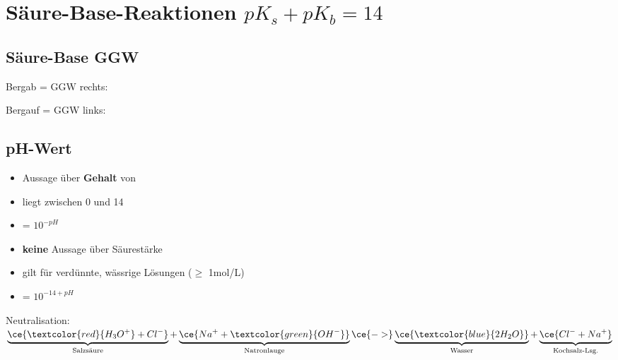 \section{Säure-Base-Reaktionen $pK_{s}+ pK_{b} = 14$}
    
\subsection{Säure-Base GGW}
    Bergab = GGW rechts: 

    Bergauf = GGW links: 

\subsection{pH-Wert}
    \begin{minipage}{0.4\columnwidth}
        \begin{itemize}
            \item Aussage über \textbf{Gehalt} von 
            \item liegt zwischen 0 und 14
            \item \ce{[H3O+]} = $10^{-pH}$
        \end{itemize}
    \end{minipage}
    \hfill
    \begin{minipage}{0.59\columnwidth}
        \begin{itemize}
            \item \textbf{keine} Aussage über Säurestärke
            \item gilt für verdünnte, wässrige Lösungen ($\geq$ 1mol/L)
            \item \ce{[OH^-]} = $10^{-14+pH}$
        \end{itemize}
    \end{minipage}
    
    Neutralisation: $\underbrace{\ce{\textcolor{red}{H_3O^+} + {Cl^-}}}_{\text{Salzsäure}} + \underbrace{\ce{{Na^+} + \textcolor{green}{OH^-}}}_{\text{Natronlauge}} \ce{->} \underbrace{\ce{\textcolor{blue}{2 H_2O}}}_{\text{Wasser}} + \underbrace{\ce{{Cl^-} + {Na^+}}}_{\text{Kochsalz-Lsg.}}$